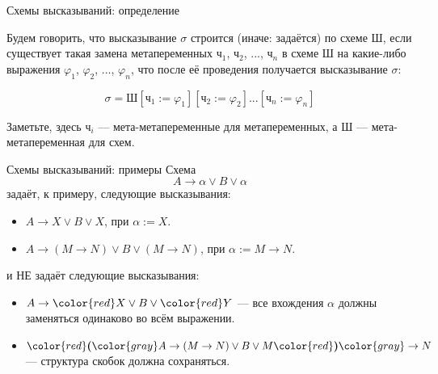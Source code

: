 \documentclass[aspectratio=169]{beamer}
\begin{document}
\begin{frame}{Схемы высказываний: определение}

\begin{defrus}Будем говорить, что высказывание $\sigma$ строится (иначе: задаётся) по схеме $\textit{Ш}$, 
если существует такая замена метапеременных $\textit{ч}_1$, $\textit{ч}_2$, ..., $\textit{ч}_n$ 
в схеме $\textit{Ш}$ на какие-либо выражения $\varphi_1$, $\varphi_2$, ..., $\varphi_n$, 
что после её проведения получается высказывание $\sigma$:

$$\sigma = \textit{Ш}[\textit{ч}_1 := \varphi_1][\textit{ч}_2 := \varphi_2]...[\textit{ч}_n := \varphi_n]$$

Заметьте, здесь $\textit{ч}_i$ --- мета-метапеременные для метапеременных, а $\textit{Ш}$ --- мета-метапеременная для схем.
\end{defrus}
\end{frame}

\begin{frame}{Схемы высказываний: примеры}
Схема $$A \rightarrow \alpha \vee B \vee \alpha$$ задаёт, к примеру, следующие высказывания:
\begin{itemize}
\item $A \rightarrow X \vee B \vee X$, при $\alpha := X$.
\item $A \rightarrow (M\rightarrow N) \vee B \vee (M \rightarrow N)$, при $\alpha := M\rightarrow N$.
\end{itemize}

\vspace{0.5cm}\pause

и {\color{red} НЕ} задаёт следующие высказывания:
\begin{itemize}
\item {\color{red} $A \rightarrow {\color{red}X} \vee B \vee {\color{red}Y}$} --- все вхождения $\alpha$ должны заменяться одинаково во всём выражении.
\item { ${\color{red}\textbf{(}}{\color{gray}A \rightarrow (M \rightarrow N) \vee B \vee M}{\color{red}\textbf{)}} \color{gray}\rightarrow N$} --- структура скобок должна сохраняться.
\end{itemize}

\end{frame}

%
%
%
%
%
%
\end{document}
